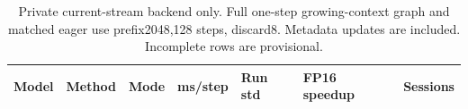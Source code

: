 \begin{table}[t]
\centering
\small
\caption{Private current-stream backend only. Full one-step growing-context graph and matched eager use prefix2048,128 steps, discard8. Metadata updates are included. Incomplete rows are provisional.}
\begin{tabular}{lllllll}
\toprule
Model & Method & Mode & ms/step & Run std & FP16 speedup & Sessions \\
\midrule
\bottomrule
\end{tabular}
\end{table}
